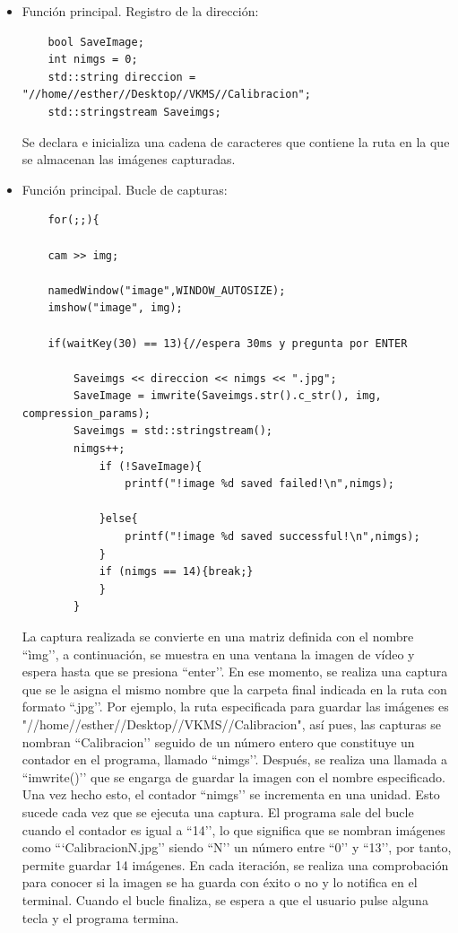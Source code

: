 \begin{itemize}
    \item Función principal. Registro de la dirección: \\
    
    \begin{verbatim} 
    bool SaveImage;
	int nimgs = 0;
	std::string direccion = "//home//esther//Desktop//VKMS//Calibracion";
	std::stringstream Saveimgs;
    \end{verbatim} 
    
Se declara e inicializa una cadena de caracteres que contiene la ruta en la que se almacenan las imágenes capturadas.
    
    \item Función principal. Bucle de capturas: \\

    \begin{verbatim} 
    for(;;){
    	
    cam >> img;
    	
    namedWindow("image",WINDOW_AUTOSIZE);
    imshow("image", img);
    	
    if(waitKey(30) == 13){//espera 30ms y pregunta por ENTER
    
    	Saveimgs << direccion << nimgs << ".jpg";
    	SaveImage = imwrite(Saveimgs.str().c_str(), img, compression_params);
    	Saveimgs = std::stringstream();
    	nimgs++;
    		if (!SaveImage){
    			printf("!image %d saved failed!\n",nimgs);
    
    		}else{
    			printf("!image %d saved successful!\n",nimgs);
    		}
    		if (nimgs == 14){break;}
    		}
    	}
    \end{verbatim} 
    
La captura realizada se convierte en una matriz definida con el nombre ``ìmg’’, a continuación, se muestra en una ventana la imagen de vídeo y espera hasta que se presiona ``enter’’. En ese momento, se realiza una captura que se le asigna el mismo nombre que la carpeta final indicada en la ruta con formato ``.jpg’’. Por ejemplo, la ruta especificada para guardar las imágenes es "//home//esther//Desktop//VKMS//Calibracion", así pues, las capturas se nombran ``Calibracion’’ seguido de un número entero que constituye un contador en el programa, llamado ``nimgs’’. Después, se realiza una llamada a ``imwrite()’’ que se engarga de guardar la imagen con el nombre especificado. Una vez hecho esto, el contador ``nimgs’’ se incrementa en una unidad. Esto sucede cada vez que se ejecuta una captura. El programa sale del bucle cuando el contador es igual a ``14’’, lo que significa que se nombran imágenes como ```CalibracionN.jpg’’ siendo ``N’’ un número entre ``0’’ y ``13’’, por tanto, permite guardar 14 imágenes. En cada iteración, se realiza una comprobación para conocer si la imagen se ha guarda con éxito o no y lo notifica en el terminal. Cuando el bucle finaliza, se espera a que el usuario pulse alguna tecla y el programa termina.
    
\end{itemize}


